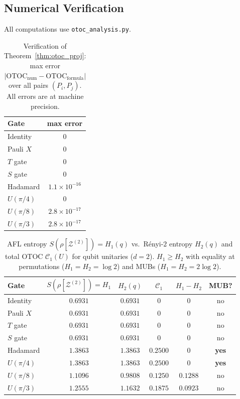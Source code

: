 \documentclass[12pt,a4paper]{article}
\begin{document}
\subsection{Numerical Verification}

All computations use \texttt{otoc\_analysis.py}.

\begin{table}[h]
\centering
\caption{Verification of Theorem~\ref{thm:otoc_proj}: max error $|\mathrm{OTOC}_{\mathrm{num}}-\mathrm{OTOC}_{\mathrm{formula}}|$ over all pairs $(P_i,P_j)$.  All errors are at machine precision.}
\label{tab:otoc_verify}
\begin{tabular}{l|c}
Gate & max error \\ \hline
Identity & $0$ \\
Pauli $X$ & $0$ \\
$T$ gate  & $0$ \\
$S$ gate  & $0$ \\
Hadamard  & $1.1\times10^{-16}$ \\
$U(\pi/4)$& $0$ \\
$U(\pi/8)$& $2.8\times10^{-17}$ \\
$U(\pi/3)$& $2.8\times10^{-17}$
\end{tabular}
\end{table}

\begin{table}[h]
\centering
\caption{AFL entropy $S(\rho[\mathcal{Z}^{(2)}])=H_1(q)$ vs.\ Rényi-$2$ entropy $H_2(q)$ and total OTOC $\mathcal{C}_1(U)$ for qubit unitaries ($d=2$).  $H_1\geq H_2$ with equality at permutations ($H_1=H_2=\log 2$) and MUBs ($H_1=H_2=2\log 2$).}
\label{tab:afl_otoc}
\begin{tabular}{l|c|c|c|c|c}
Gate & $S(\rho[\mathcal{Z}^{(2)}])=H_1$ & $H_2(q)$ & $\mathcal{C}_1$ & $H_1-H_2$ & MUB? \\ \hline
Identity   & $0.6931$ & $0.6931$ & $0$       & $0$        & no \\
Pauli $X$  & $0.6931$ & $0.6931$ & $0$       & $0$        & no \\
$T$ gate   & $0.6931$ & $0.6931$ & $0$       & $0$        & no \\
$S$ gate   & $0.6931$ & $0.6931$ & $0$       & $0$        & no \\
Hadamard   & $1.3863$ & $1.3863$ & $0.2500$  & $0$        & \textbf{yes} \\
$U(\pi/4)$ & $1.3863$ & $1.3863$ & $0.2500$  & $0$        & \textbf{yes} \\
$U(\pi/8)$ & $1.1096$ & $0.9808$ & $0.1250$  & $0.1288$   & no \\
$U(\pi/3)$ & $1.2555$ & $1.1632$ & $0.1875$  & $0.0923$   & no
\end{tabular}
\end{table}
\end{document}
